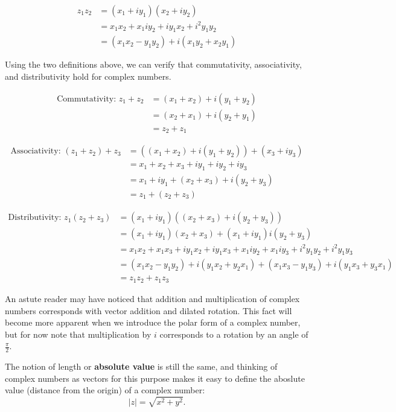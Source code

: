\documentclass{exam}
\begin{document}
\begin{align*}
    z_1 z_2 &= (x_1 + iy_1)(x_2 + iy_2) \\
    &= x_1x_2 + x_1iy_2 + iy_1x_2 + i^2y_1y_2 \\
    &= (x_1x_2 - y_1y_2) + i(x_1y_2 + x_2y_1)
\end{align*}

\newpage

Using the two definitions above, we can verify that commutativity, associativity, and distributivity
hold for complex numbers.

\begin{align*}
    \text{Commutativity: }z_1 + z_2 &= (x_1 + x_2) + i(y_1 + y_2) \\
    &= (x_2 + x_1) + i(y_2 + y_1) \\
    &= z_2 + z_1
\end{align*}

\begin{align*}
    \text{Associativity: }(z_1 + z_2) + z_3 &= ((x_1 + x_2) + i(y_1 + y_2)) + (x_3 + iy_3) \\
    &= x_1 + x_2 + x_3 + iy_1 + iy_2 + iy_3 \\
    &= x_1 + iy_1 + (x_2 + x_3) + i(y_2 + y_3) \\
    &= z_1 + (z_2 + z_3)
\end{align*}

\begin{align*}
    \text{Distributivity: }z_1(z_2 + z_3) &= (x_1 + iy_1)((x_2 + x_3) + i(y_2 + y_3)) \\
    &= (x_1 + iy_1)(x_2 + x_3) + (x_1 + iy_1)i(y_2 + y_3) \\
    &= x_1x_2 + x_1x_3 + iy_1x_2 + iy_1x_3 + x_1iy_2 + x_1iy_3 + i^2y_1y_2 + i^2y_1y_3 \\
    &= (x_1x_2 - y_1y_2) + i(y_1x_2 + y_2x_1) + (x_1x_3 - y_1y_3) + i(y_1x_3 + y_3x_1) \\
    &= z_1z_2 + z_1z_3
\end{align*}

An astute reader may have noticed that addition and multiplication of complex numbers corresponds
with vector addition and dilated rotation. This fact will become more apparent when we introduce
the polar form of a complex number, but for now note that multiplication by $i$ corresponds
to a rotation by an angle of $\frac{\pi}{2}$.

The notion of length or \textbf{absolute value} is still the same, and thinking of complex numbers as vectors
for this purpose makes it easy to define the aboslute value (distance from the origin) of a
complex number:
$$|z| = \sqrt{x^2 + y^2}.$$
\end{document}
